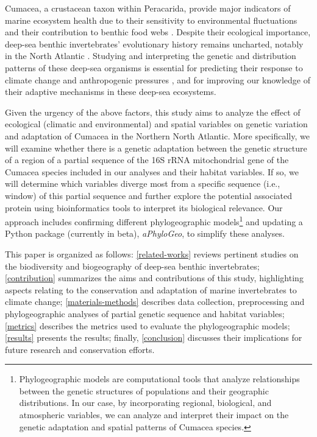 Cumacea, a crustacean taxon within Peracarida, provide major indicators of marine ecosystem health due to their sensitivity to environmental fluctuations \citep{stransky_diversity_2010} and their contribution to benthic food webs \citep{rehm2009cumacea}. Despite their ecological importance, deep-sea benthic invertebrates’ evolutionary history remains uncharted, notably in the North Atlantic \citep{jennings_phylogeographic_2014}. Studying and interpreting the genetic and distribution patterns of these deep-sea organisms is essential for predicting their response to climate change \citep{jennings_phylogeographic_2014} and anthropogenic pressures \citep{meisner_prefacebiodiversity_2018}, and for improving our knowledge of their adaptive mechanisms in these deep-sea ecosystems.

Given the urgency of the above factors, this study aims to analyze the effect of ecological (climatic and environmental) and spatial variables on genetic variation and adaptation of Cumacea in the Northern North Atlantic. More specifically, we will examine whether there is a genetic adaptation between the genetic structure of a region of a partial sequence of the 16S rRNA mitochondrial gene of the Cumacea species included in our analyses and their habitat variables. If so, we will determine which variables diverge most from a specific sequence (i.e., window) of this partial sequence and further explore the potential associated protein using bioinformatics tools to interpret its biological relevance. Our approach includes confirming different {phylogeographic models}\footnote{Phylogeographic models are computational tools that analyze relationships between the genetic structures of populations and their geographic distributions. In our case, by incorporating regional, biological, and atmospheric variables, we can analyze and interpret their impact on the genetic adaptation and spatial patterns of Cumacea species.} and updating a Python package (currently in beta), \textit{aPhyloGeo}, to simplify these analyses.

This paper is organized as follows: \autoref{related-works} reviews pertinent studies on the biodiversity and biogeography of deep-sea benthic invertebrates; \autoref{contribution} summarizes the aims and contributions of this study, highlighting aspects relating to the conservation and adaptation of marine invertebrates to climate change; \autoref{materials-methods} describes data collection, preprocessing and phylogeographic analyses of partial genetic sequence and habitat variables; \autoref{metrics} describes the metrics used to evaluate the phylogeographic models; \autoref{results} presents the results; finally, \autoref{conclusion} discusses their implications for future research and conservation efforts.


